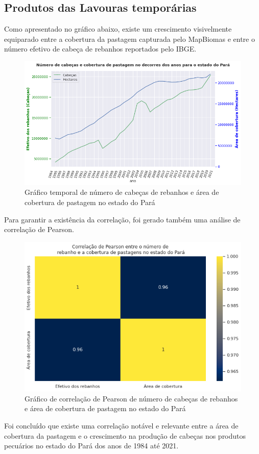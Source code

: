 \newpage
\subsection{Produtos das Lavouras temporárias}

Como apresentado no gráfico abaixo, existe um crescimento visivelmente equiparado entre a cobertura da pastagem capturada pelo MapBiomas e entre o número efetivo de cabeça de rebanhos reportados pelo IBGE.

\begin{figure}[hbt!]
    \centering
    \includegraphics[width=0.6\columnwidth]{src/plots/plot-cobertura_pastagem-numero_cabecas.png}
    \centering
    \caption{Gráfico temporal de número de cabeças de rebanhos e área de cobertura de pastagem no estado do Pará}
    \label{fig:cobertura_pastagem-numero_cabeca}
\end{figure}

Para garantir a existência da correlação, foi gerado também uma análise de correlação de Pearson.

\begin{figure}[hbt!]
    \centering
    \includegraphics[width=0.6\columnwidth]{src/plots/plot_correlacao-cobertura_pastagem-numero_cabecas.png}
    \centering
    \caption{Gráfico de correlação de Pearson de número de cabeças de rebanhos e área de cobertura de pastagem no estado do Pará}
    \label{fig:correlacao-cobertura_pastagem-numero_cabecas}
\end{figure}

Foi concluído que existe uma correlação notável e relevante entre a área de cobertura da pastagem e o crescimento na produção de cabeças nos produtos pecuários no estado do Pará dos anos de 1984 até 2021.


